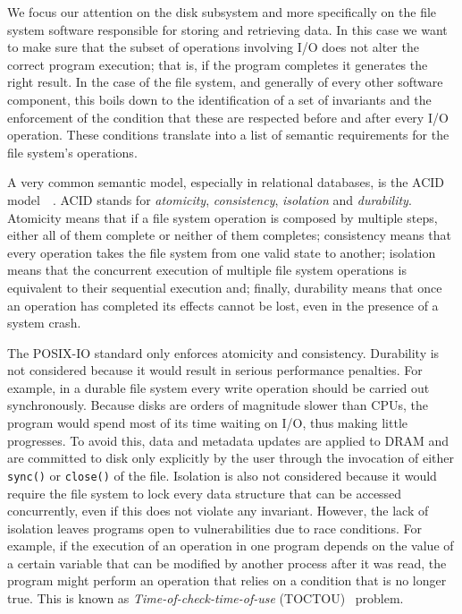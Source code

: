 We focus our attention on the disk subsystem and more specifically on the file system software responsible for storing and retrieving data. In this case we want to make sure that the subset of operations involving I/O 
does not alter the correct program execution; that is, if the program completes it generates the right result. In the case of the file system, and generally of every other software component, this boils down to 
the identification of a set of invariants and the enforcement of the condition that these are respected before and after every I/O operation. These conditions translate into a list of semantic requirements for the
file system's operations. 

A very common semantic model, especially in relational databases, is the ACID model~\cite{Gray1981}~\cite{Wright2007}. ACID stands for \textit{atomicity}, \textit{consistency}, \textit{isolation} and \textit{durability}. 
Atomicity means that if a file system operation is composed by multiple steps, either all of them complete or neither of them completes; consistency means that every operation takes the file system from one valid 
state to another; isolation means that the concurrent execution of multiple file system operations is equivalent to their sequential execution and; finally, durability means that once an operation has completed its 
effects cannot be lost, even in the presence of a system crash.

The POSIX-IO standard only enforces atomicity and consistency. Durability is not considered because it would result in serious performance penalties. For example, in a durable file system every write operation should be
carried out synchronously. Because disks are orders of magnitude slower than CPUs, the program would spend most of its time waiting on I/O, thus making little progresses. To avoid this, data and metadata updates are 
applied to DRAM and are committed to disk only explicitly by the user through the invocation of either \texttt{sync()} or \texttt{close()} of the file. Isolation is also not considered because it would require the file 
system to lock every data structure that can be accessed concurrently, even if this does not violate any invariant. However, the lack of isolation leaves programs open to vulnerabilities due to race conditions. For example, 
if the execution of an operation in one program depends on the value of a certain variable that can be modified by another process after it was read, the program might perform an operation that relies on a condition that 
is no longer true. This is known as \textit{Time-of-check-time-of-use} (TOCTOU)~\cite{Wright2007} problem.

